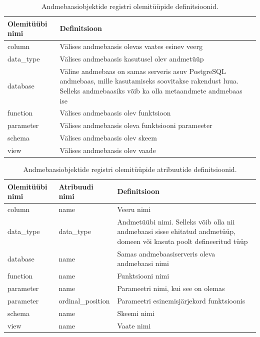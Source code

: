 \documentclass[a4paper,12pt]{article} %
\begin{document}
\begin{table}[H]
\centering
\caption{Andmebaasiobjektide registri olemitüüpide definitsioonid.}
\label{table_er_andmebaasiobjektide_registri_olemitüüpide_definitsioonid}
\begin{tabular}{|p{4cm}|p{11cm}|}
\hline
\rowcolor{rowgray}
Olemitüübi nimi & Definitsioon \\ \hline
column & Välises andmebaasis olevas vaates esinev veerg\\ \hline
data\_type & Välises andmebaasis kasutusel olev andmetüüp\\ \hline
database & Väline andmebaas on samas serveris asuv PostgreSQL andmebaas, mille kasutamiseks soovitakse rakendust luua. Selleks andmebaasiks võib ka olla metaandmete andmebaas ise\\ \hline
function & Välises andmebaasis olev funktsioon\\ \hline
parameter & Välises andmebaasis oleva funktsiooni parameeter\\ \hline
schema & Välises andmebaasis olev skeem\\ \hline
view & Välises andmebaasis olev vaade\\ \hline
\end{tabular}
\end{table}

\begin{table}[H]
\centering
\caption{Andmebaasiobjektide registri olemitüüpide atribuutide definitsioonid.}
\label{table_er_andmebaasiobjektide_registri_olemitüüpide_atribuutide_definitsioonid}
\begin{tabular}{|p{4cm}|p{4cm}|p{7cm}|}
\hline
\rowcolor{rowgray}
Olemitüübi nimi & Atribuudi nimi & Definitsioon \\ \hline
column & name & Veeru nimi \\ \hline
data\_type & data\_type & Andmetüübi nimi. Selleks võib olla nii andmebaasi sisse ehitatud andmetüüp, domeen või kasuta poolt defineeritud tüüp \\ \hline
database & name & Samas andmebaasiserveris oleva andmebaasi nimi \\ \hline
function & name & Funktsiooni nimi \\ \hline
parameter & name & Parameetri nimi, kui see on olemas \\ \hline
parameter & ordinal\_position & Parameetri esinemisjärjekord funktsioonis \\ \hline
schema & name & Skeemi nimi \\ \hline
view & name & Vaate nimi \\ \hline
\end{tabular}
\end{table}
\end{document}

